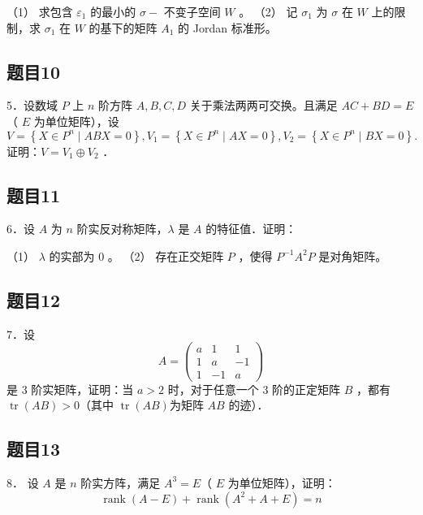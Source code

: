 \documentclass{article}
\begin{document}
（1） 求包含 \(\varepsilon_{1}\) 的最小的 \(\sigma-\) 不变子空间 \(W\) 。
（2） 记 \(\sigma_{1}\) 为 \(\sigma\) 在 \(W\) 上的限制，求 \(\sigma_{1}\) 在 \(W\) 的基下的矩阵 \(A_{1}\) 的 Jordan 标准形。

\subsection{题目10}
5．设数域 \(P\) 上 \(n\) 阶方阵 \(A, B, C, D\) 关于乘法两两可交换。且满足 \(A C+B D=E\)（ \(E\) 为单位矩阵），设
\[
V=\left\{X \in P^{n} \mid A B X=0\right\}, V_{1}=\left\{X \in P^{n} \mid A X=0\right\}, V_{2}=\left\{X \in P^{n} \mid B X=0\right\} .
\]
证明：\(V=V_{1} \oplus V_{2}\) ．

\subsection{题目11}
6．设 \(A\) 为 \(n\) 阶实反对称矩阵，\(\lambda\) 是 \(A\) 的特征值．证明：

（1） \(\lambda\) 的实部为 0 。
（2） 存在正交矩阵 \(P\) ，使得 \(P^{-1} A^{2} P\) 是对角矩阵。

\subsection{题目12}
7．设
\[
A=\left(\begin{array}{ccc}
a & 1 & 1 \\
1 & a & -1 \\
1 & -1 & a
\end{array}\right)
\]
是 3 阶实矩阵，证明：当 \(a>2\) 时，对于任意一个 3 阶的正定矩阵 \(B\) ，都有 \(\operatorname{tr}(A B)>0\)（其中 \(\operatorname{tr}(A B)\)为矩阵 \(A B\) 的迹）．

\subsection{题目13}
8． 设 \(A\) 是 \(n\) 阶实方阵，满足 \(A^{3}=E\)（ \(E\) 为单位矩阵），证明：
\[
\operatorname{rank}(A-E)+\operatorname{rank}\left(A^{2}+A+E\right)=n
\]
\end{document}

